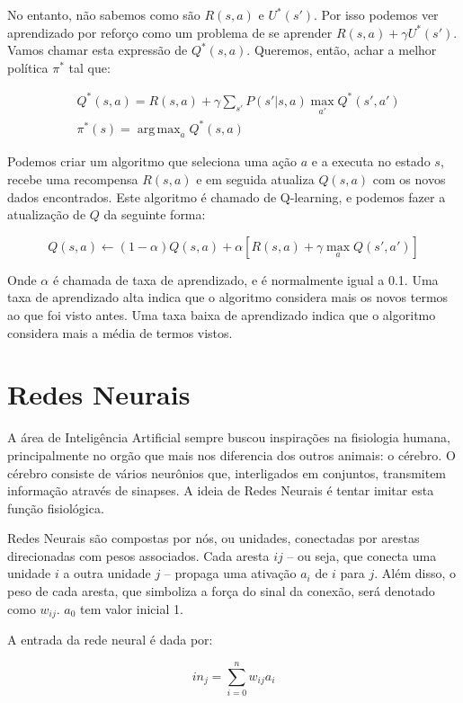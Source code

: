 \documentclass[a4paper,10pt]{article}
\DeclareMathOperator*{\argmax}{arg\,max}
\theoremstyle{plain}
\begin{document}
No entanto, não sabemos como são $R(s, a)$ e $U^*(s')$. Por isso podemos ver aprendizado por
reforço como um problema de se aprender $R(s, a) + \gamma U^*(s')$. Vamos chamar esta expressão
de $Q^*(s, a)$. Queremos, então, achar a melhor política $\pi^*$ tal que:

\begin{align*}
  &Q^*(s, a) = R(s, a) + \gamma \sum_{s'} P(s'|s,a) \max_{a'} Q^*(s', a') \\
  &\pi^*(s) = \argmax_a Q^*(s, a)
\end{align*}

Podemos criar um algoritmo que seleciona uma ação $a$ e a executa no estado $s$, recebe uma
recompensa $R(s,a)$ e em seguida atualiza $Q(s,a)$ com os novos dados encontrados. Este algoritmo
é chamado de Q-learning, e podemos fazer a atualização de $Q$ da seguinte forma:

\begin{equation*}
  Q(s, a) \gets (1-\alpha)Q(s,a) + \alpha[R(s,a) + \gamma \max_a Q(s', a')]
\end{equation*}

Onde $\alpha$ é chamada de taxa de aprendizado, e é normalmente igual a 0.1. Uma taxa de
aprendizado alta indica que o algoritmo considera mais os novos termos ao que foi visto antes. Uma
taxa baixa de aprendizado indica que o algoritmo considera mais a média de termos vistos.

\section{Redes Neurais}

A área de Inteligência Artificial sempre buscou inspirações na fisiologia humana, principalmente no
orgão que mais nos diferencia dos outros animais: o cérebro. O cérebro consiste de vários neurônios
que, interligados em conjuntos, transmitem informação através de sinapses. A ideia de Redes Neurais
é tentar imitar esta função fisiológica.

Redes Neurais são compostas por nós, ou unidades, conectadas por arestas direcionadas com pesos
associados. Cada aresta $ij$ -- ou seja, que conecta uma unidade $i$ a outra unidade $j$ -- propaga
uma ativação $a_i$ de $i$ para $j$. Além disso, o peso de cada aresta, que simboliza a força do
sinal da conexão, será denotado como $w_{ij}$. $a_0$ tem valor inicial 1.

A entrada da rede neural é dada por:

\begin{equation*}
  in_j = \sum_{i=0}^n w_{ij} a_i
\end{equation*}
\end{document}
